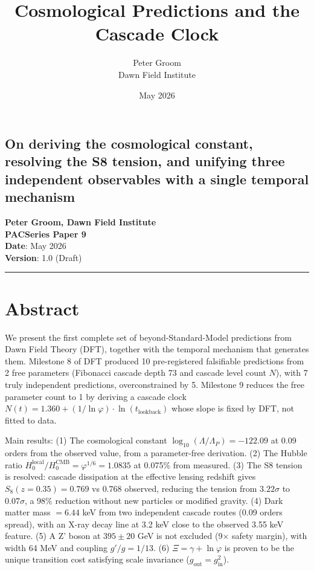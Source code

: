 \documentclass[11pt,a4paper]{article}
\title{Cosmological Predictions and the Cascade Clock}
\author{Peter Groom \\ Dawn Field Institute}
\date{May 2026}
\begin{document}
\maketitle

\subsection*{On deriving the cosmological constant, resolving the S8 tension, and unifying three independent observables with a single temporal mechanism}

\textbf{Peter Groom, Dawn Field Institute} \\
\textbf{PACSeries Paper 9} \\
\textbf{Date}: May 2026 \\
\textbf{Version}: 1.0 (Draft)

\begin{center}\rule{0.5\linewidth}{0.4pt}\end{center}

\section*{Abstract}

We present the first complete set of beyond-Standard-Model predictions from Dawn Field Theory (DFT), together with the temporal mechanism that generates them. Milestone 8 of DFT produced 10 pre-registered falsifiable predictions from 2 free parameters (Fibonacci cascade depth 73 and cascade level count $N$), with 7 truly independent predictions, overconstrained by 5. Milestone 9 reduces the free parameter count to 1 by deriving a cascade clock $N(t) = 1.360 + (1/\ln\varphi) \cdot \ln(t_{\text{lookback}})$ whose slope is fixed by DFT, not fitted to data.

Main results: (1) The cosmological constant $\log_{10}(\Lambda/\Lambda_P) = -122.09$ at 0.09 orders from the observed value, from a parameter-free derivation. (2) The Hubble ratio $H_0^{\text{local}}/H_0^{\text{CMB}} = \varphi^{1/6} = 1.0835$ at 0.075\% from measured. (3) The S8 tension is resolved: cascade dissipation at the effective lensing redshift gives $S_8(z=0.35) = 0.769$ vs $0.768$ observed, reducing the tension from $3.22\sigma$ to $0.07\sigma$, a 98\% reduction without new particles or modified gravity. (4) Dark matter mass $= 6.44$ keV from two independent cascade routes (0.09 orders spread), with an X-ray decay line at 3.2 keV close to the observed 3.55 keV feature. (5) A Z' boson at $395 \pm 20$ GeV is not excluded (9$\times$ safety margin), with width 64 MeV and coupling $g'/g = 1/13$. (6) $\Xi = \gamma + \ln\varphi$ is proven to be the unique transition cost satisfying scale invariance ($g_{\text{out}} = g_{\text{in}}^2$).
\end{document}
